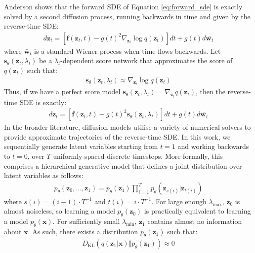 \documentclass[ oneside,%
                    author={George Herbert},
                    degree={MSci},
                     title={Video Diffusion Models for Climate Simulations},
                  subtitle={}]{dissertation}
\begin{document}
Anderson \cite{Reverse_Time_Diffusion_Anderson} shows that the forward SDE of Equation \ref{eq:forward_sde} is exactly solved by a second diffusion process, running backwards in time and given by the reverse-time SDE:
\begin{align}
      d\mathbf{z}_t=\left[\mathbf{f}(\mathbf{z}_t, t)-g(t)^2\nabla_{\mathbf{z}_t}\log q(\mathbf{z}_t)\right]dt + g(t)d\bar{\mathbf{w}_t}
\end{align}
where $\bar{\mathbf{w}}_t$ is a standard Wiener process when time flows backwards. Let $\mathbf{s}_\theta(\mathbf{z}_t, \lambda_t)$ be a $\lambda_t$-dependent score network \cite{Generative_Modelling_By_Estimating_Gradients_Song} that approximates the score of $q(\mathbf{z}_t)$ such that:
\begin{align}
      \mathbf{s}_\theta(\mathbf{z}_t, \lambda_t)\approx \nabla_{\mathbf{z}_t} \log q(\mathbf{z}_t)\label{eq:score_network}
\end{align}
Thus, if we have a perfect score model $\mathbf{s}_\theta(\mathbf{z}_t, \lambda_t)=\nabla_{\mathbf{z}_t}q(\mathbf{z}_t)$, then the reverse-time SDE is exactly:
\begin{align}
      d\mathbf{z}_t=\left[\mathbf{f}(\mathbf{z}_t, t)-g(t)^2\mathbf{s}_\theta(\mathbf{z}_t, \lambda_t)\right]dt + g(t)d\bar{\mathbf{w}_t}
\end{align}
In the broader literature, diffusion models utilise a variety of numerical solvers to provide approximate trajectories of the reverse-time SDE. In this work, we sequentially generate latent variables starting from $t=1$ and working backwards to $t=0$, over $T$ uniformly-spaced discrete timesteps. More formally, this comprises a hierarchical generative model that defines a joint distribution over latent variables as follows:
\begin{align}
      p_\theta(\mathbf{z}_0,\ldots,\mathbf{z}_1)=p_\theta(\mathbf{z}_1)\prod_{i=1}^T p_\theta(\mathbf{z}_{s(i)}|\mathbf{z}_{t(i)})
\end{align}
where $s(i)=(i - 1)\cdot T^{-1}$ and $t(i)=i\cdot T^{-1}$. For large enough $\lambda_{\max}$, $\mathbf{z}_0$ is almost noiseless, so learning a model $p_\theta(\mathbf{z}_0)$ is practically equivalent to learning a model $p_\theta(\mathbf{x})$. For sufficiently small $\lambda_{\min}$, $\mathbf{z}_1$ contains almost no information about $\mathbf{x}$. As such, there exists a distribution $p_\theta(\mathbf{z}_1)$ such that:
\begin{align}
      D_{\mathrm{KL}}(q(\mathbf{z}_1|\mathbf{x})\Vert p_\theta(\mathbf{z}_1))\approx 0
\end{align}
\end{document}
